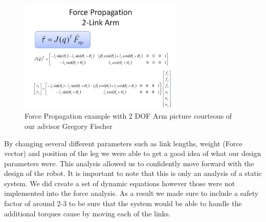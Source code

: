              \begin{figure}[H]
                    \centering
                    \includegraphics[width=0.7\textwidth]{figures/ForcePropagation.PNG}
                    \caption{Force Propagation example with 2 DOF Arm picture courteous of our advisor Gregory Fischer}
                    \label{fig:ForcePropogation}
                \end{figure}  
             
             By changing several different parameters such as link lengths, weight (Force vector) and position of the leg we were able to get a good idea of what our design parameters were. This analysis allowed us to confidently move forward with the design of the robot. It is important to note that this is only an analysis of a static system. We did create a set of dynamic equations however those were not implemented into the force analysis. As a result we made sure to include a safety factor of around 2-3 to be sure that the system would be able to handle the additional torques cause by moving each of the links. 
             

